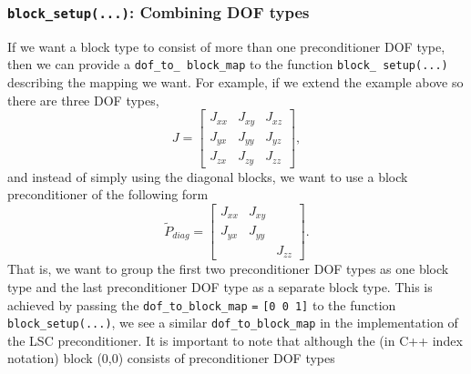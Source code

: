 \subsubsection{\texttt{block\_setup(...)}: Combining DOF types\label{sec:block_setup_combining_dof_types}}
If we want a block type to consist of more than one preconditioner DOF type,
then we can provide a \texttt{dof\_\allowbreak to\_\allowbreak
  block\_\allowbreak map} to the function \texttt{block\_\allowbreak
  setup(...)} describing the mapping we want. For example, if we extend the
example above so there are three DOF types,
\begin{equation*}
J =
\begin{bmatrix}
J_{xx}&J_{xy}&J_{xz} \\
J_{yx}&J_{yy}&J_{yz} \\
J_{zx}&J_{zy}&J_{zz}
\end{bmatrix},
\end{equation*}
and instead of simply using the diagonal blocks, we want to use a block
preconditioner of the following form
\begin{equation*}
\tilde{P}_{diag} =
\begin{bmatrix}
J_{xx}&J_{xy}&       \\
J_{yx}&J_{yy}&       \\
      &      &J_{zz}
\end{bmatrix}.
\end{equation*}
That is, we want to group the first two preconditioner DOF types as one block
type and the last preconditioner DOF type as a separate block type. This is
achieved by passing the \verb+dof_to_block_map+ \verb+=+ \verb+[0 0 1]+ to the
function \verb+block_setup(...)+, we see a similar \verb+dof_to_block_map+ in
the implementation of the LSC preconditioner. It is important to note that
although the (in C++ index notation) block (0,0) consists of preconditioner DOF
types 
%
